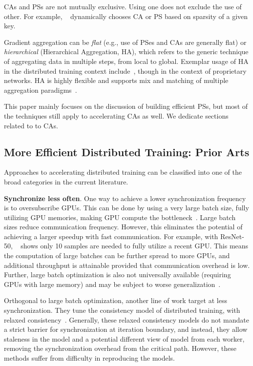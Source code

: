 CAs and PSs are not mutually exclusive. Using one does not exclude the use of other. For example, ~\cite{10.1145/3302424.3303957} dynamically chooses CA or PS based on sparsity of a given key.

Gradient aggregation can be \textit{flat} (e.g., use of PSes and CAs are generally flat) or \textit{hierarchical} (Hierarchical Aggregation, HA), which refers to the generic technique of aggregating data in multiple steps, from local to global. Exemplar usage of HA in the distributed training context include~\cite{firecaffe,choblueconnect,Geng:2018:HHP:3229543.3229544,sysmlblueconnect}, though in the context of proprietary networks. HA is highly flexible and supports mix and matching of multiple aggregation paradigms~\cite{topoawarempi, cool}.

This paper mainly focuses on the discussion of building efficient PSs, but most of the techniques still apply to accelerating CAs as well. We dedicate sections related to \cmpi to CAs. 

\subsection{More Efficient Distributed Training: Prior Arts}
Approaches to accelerating distributed training can be classified into one of the broad categories in the current literature.

\noindent\textbf{Synchronize less often}. One way to achieve a lower synchronization frequency is to oversubscribe GPUs. This can be done by using a very large batch size, fully utilizing GPU memories, making GPU compute the bottleneck~\cite{Nowanyon13:online, ImageNetIn1Hour, sridharan2018scaleout, jia2018highly, you2019large,you2017large}. Large batch sizes reduce communication frequency. However, this eliminates the potential of achieving a larger speedup with fast communication. For example, with ResNet-50, ~\cite{Shen2018NexusA} shows only 10 samples are needed to fully utilize a recent GPU. This means the computation of large batches can be further spread to more GPUs, and additional throughput is attainable provided that communication overhead is low. Further, large batch optimization is also not universally available (requiring GPUs with large memory) and may be subject to worse generalization~\cite{keskar2016large}.

Orthogonal to large batch optimization, another line of work target at less synchronization. They tune the consistency model of distributed training, with relaxed consistency~\cite{DBLP:journals/corr/DaiKWHGX14,SSP,BSP,Wei:2015:MCC:2806777.2806778,Litz,xie2018orpheus,wang2018adaptive}. Generally, these relaxed consistency models do not mandate a strict barrier for synchronization at iteration boundary, and instead, they allow staleness in the model and a potential different view of model from each worker, removing the synchronization overhead from the critical path. However, these methods suffer from difficulty in reproducing the models. 

